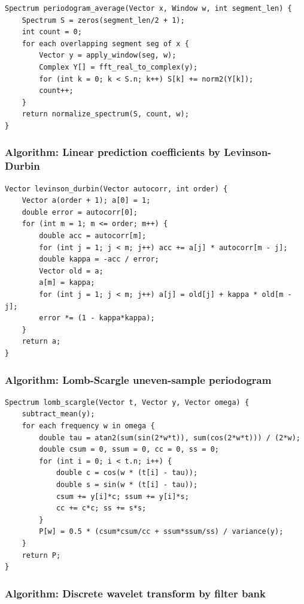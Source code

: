 \documentclass[11pt]{article}
\begin{document}
\begin{verbatim}
Spectrum periodogram_average(Vector x, Window w, int segment_len) {
    Spectrum S = zeros(segment_len/2 + 1);
    int count = 0;
    for each overlapping segment seg of x {
        Vector y = apply_window(seg, w);
        Complex Y[] = fft_real_to_complex(y);
        for (int k = 0; k < S.n; k++) S[k] += norm2(Y[k]);
        count++;
    }
    return normalize_spectrum(S, count, w);
}
\end{verbatim}

\subsubsection{Algorithm: Linear prediction coefficients by Levinson-Durbin}\label{algorithm-linear-prediction-coefficients-by-levinson-durbin}

\begin{verbatim}
Vector levinson_durbin(Vector autocorr, int order) {
    Vector a(order + 1); a[0] = 1;
    double error = autocorr[0];
    for (int m = 1; m <= order; m++) {
        double acc = autocorr[m];
        for (int j = 1; j < m; j++) acc += a[j] * autocorr[m - j];
        double kappa = -acc / error;
        Vector old = a;
        a[m] = kappa;
        for (int j = 1; j < m; j++) a[j] = old[j] + kappa * old[m - j];
        error *= (1 - kappa*kappa);
    }
    return a;
}
\end{verbatim}

\subsubsection{Algorithm: Lomb-Scargle uneven-sample periodogram}\label{algorithm-lomb-scargle-uneven-sample-periodogram}

\begin{verbatim}
Spectrum lomb_scargle(Vector t, Vector y, Vector omega) {
    subtract_mean(y);
    for each frequency w in omega {
        double tau = atan2(sum(sin(2*w*t)), sum(cos(2*w*t))) / (2*w);
        double csum = 0, ssum = 0, cc = 0, ss = 0;
        for (int i = 0; i < t.n; i++) {
            double c = cos(w * (t[i] - tau));
            double s = sin(w * (t[i] - tau));
            csum += y[i]*c; ssum += y[i]*s;
            cc += c*c; ss += s*s;
        }
        P[w] = 0.5 * (csum*csum/cc + ssum*ssum/ss) / variance(y);
    }
    return P;
}
\end{verbatim}

\subsubsection{Algorithm: Discrete wavelet transform by filter bank}\label{algorithm-discrete-wavelet-transform-by-filter-bank}
\end{document}
